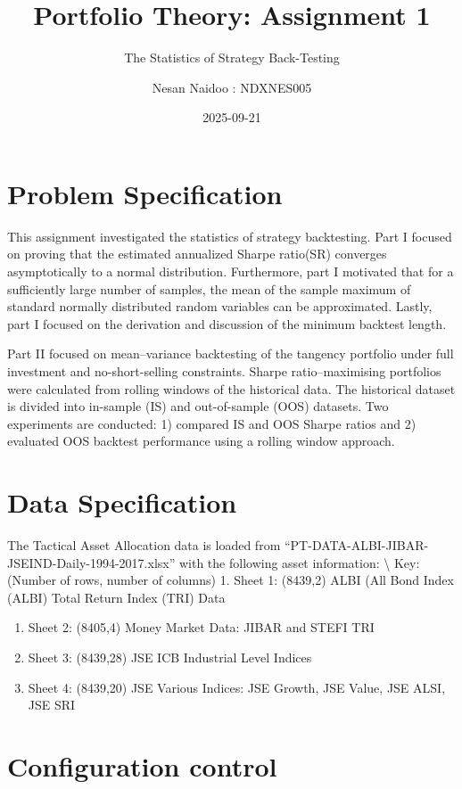 \documentclass[
  12pt,
]{article}
\title{Portfolio Theory: Assignment 1}
\subtitle{The Statistics of Strategy Back-Testing}
\author{Nesan Naidoo : NDXNES005}
\date{2025-09-21}
\begin{document}
\maketitle

\section{Problem Specification}\label{problem-specification}

This assignment investigated the statistics of strategy backtesting.
Part I focused on proving that the estimated annualized Sharpe ratio(SR)
converges asymptotically to a normal distribution. Furthermore, part I
motivated that for a sufficiently large number of samples, the mean of
the sample maximum of standard normally distributed random variables can
be approximated. Lastly, part I focused on the derivation and discussion
of the minimum backtest length.

Part II focused on mean--variance backtesting of the tangency portfolio
under full investment and no-short-selling constraints. Sharpe
ratio--maximising portfolios were calculated from rolling windows of the
historical data. The historical dataset is divided into in-sample (IS)
and out-of-sample (OOS) datasets. Two experiments are conducted: 1)
compared IS and OOS Sharpe ratios and 2) evaluated OOS backtest
performance using a rolling window approach.

\section{Data Specification}\label{data-specification}

The Tactical Asset Allocation data is loaded from
``PT-DATA-ALBI-JIBAR-JSEIND-Daily-1994-2017.xlsx'' with the following
asset information: \textbackslash{} Key: (Number of rows, number of
columns) 1. Sheet 1: (8439,2) ALBI (All Bond Index (ALBI) Total Return
Index (TRI) Data

\begin{enumerate}
\def\labelenumi{\arabic{enumi}.}
\setcounter{enumi}{1}
\item
  Sheet 2: (8405,4) Money Market Data: JIBAR and STEFI TRI
\item
  Sheet 3: (8439,28) JSE ICB Industrial Level Indices
\item
  Sheet 4: (8439,20) JSE Various Indices: JSE Growth, JSE Value, JSE
  ALSI, JSE SRI
\end{enumerate}

\section{Configuration control}\label{configuration-control}
\end{document}
